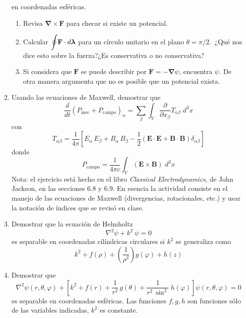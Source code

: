 \begin{enumerate}
en coordenadas esféricas.
\begin{enumerate}
\item Revisa $\bm{\nabla} \times \mathbf{F}$ para checar si existe un potencial.
\item Calcular $\mathlarger{\oint} \mathbf{F} \cdot d \bm{\lambda}$ para un círculo unitario en el plano $\theta = \pi/2$.\
¿Qué nos dice esto sobre la fuerza?¿Es conservativa o no conservativa?
\item Si considera que $\mathbf{F}$ se puede describir por $\mathbf{F} = - \bm{\nabla}\psi$, encuentra $\psi$. De otra manera argumenta que no es posible que un potencial exista.
\end{enumerate}
\item Usando las ecuaciones de Maxwell, demostrar que
\[ \dfrac{d}{dt} ( P_{\text{mec}} + P_{\text{campo}} )_{\alpha} = \sum_{\beta} \int_{V} \dfrac{\partial}{\partial x_{\beta}} T_{\alpha \beta} \; d^{3} x \]
con
\[ T_{\alpha \beta} =  \dfrac{1}{4 \pi} \left[ E_{\alpha} \, E_{\beta} + B_{\alpha} \, B_{\beta} - \dfrac{1}{2} (\mathbf{E} \cdot \mathbf{E} + \mathbf{B} \cdot \mathbf{B}) \delta_{\alpha \beta} \right]  \]
donde
\[ P_{\text{campo}} = \dfrac{1}{4 \pi c} \int_{V} (\mathbf{E} \times \mathbf{B}) \; d^{3} x \]
Nota: el ejercicio está hecho en el libro \emph{Classical Electrodynamics}, de John Jackson, en las secciones 6.8 y 6.9. En esencia la actividad consiste en el manejo de las ecuaciones de Maxwell (divergencias, rotacionales, etc.) y usar la notación de índices que se revisó en clase.
\item Demostrar que la ecuación de Helmholtz
\[ \nabla^{2} \psi + k^{2} \: \psi = 0 \]
es separable en coordenadas cilíndricas circulares si $k^{2}$ se generaliza como
\[ k^{2} + f(\rho) + \left( \dfrac{1}{\rho^{2}} \right) g(\varphi) + h(z) \]
\item Demostrar que
\[ \nabla^{2} \psi (r, \theta, \varphi) + \left[ k^{2} + f(r) + \dfrac{1}{r^{2}} \, g(\theta) + \dfrac{1}{r^{2} \, \sin^{2}} \: h(\varphi) \right] \psi (r, \theta, \varphi) = 0 \]
es separable en coordenadas esféricas. Las funciones $f,g,h$ son funciones sólo de las variables indicadas, $k^{2}$ es constante.

\end{enumerate}
